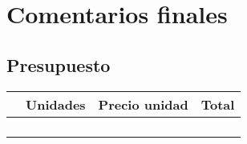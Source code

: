 

\chapter{Comentarios finales}
\label{chap:conclusiones}

\section{Presupuesto}


\begin{table}[H]
  \begin{center}
    \begin{tabular}{|p{8cm}|p{2cm}|p{2cm}|p{2cm}|}
      \hline
      \vspace{+0.2in}{\textbf{Descripción}} & {\textbf{Unidades}} & {\textbf{Precio \EUR{} unidad }} & {\textbf{Total \EUR{}}}\\
      \hline
      \vspace{+0.2in}{Raspberry Pi 3 Modelo B} &  \vspace{+0.2in}{1} &  \vspace{+0.2in}{38,70} &  \vspace{+0.2in}{38,70}\\
      \hline
      \vspace{+0.2in}{Cámara USB alta definición} &  \vspace{+0.2in}{1} &  \vspace{+0.2in}{39,90} &  \vspace{+0.2in}{39,90}\\
      \hline
      \vspace{+0.2in}{Tarjeta de expansión con batería de Litio para Raspberry Pi} &  \vspace{+0.2in}{1} &  \vspace{+0.2in}{16,99} &  \vspace{+0.2in}{16,99}\\
      \hline
      \vspace{+0.2in}{Lipo batería (3.7v, 600mAh Lipo) } & \vspace{+0.2in}{1} & \vspace{+0.2in}{13,99} & \vspace{+0.2in}{13,99}\\

\end{tabular}
\end{center}
\end{table}
